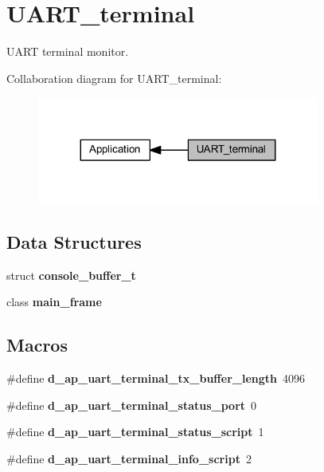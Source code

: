 \section{U\+A\+R\+T\+\_\+terminal}
\label{group___u_a_r_t__terminal}


U\+A\+RT terminal monitor.  


Collaboration diagram for U\+A\+R\+T\+\_\+terminal\+:
\nopagebreak
\begin{figure}[H]
\begin{center}
\leavevmode
\includegraphics[width=263pt]{group___u_a_r_t__terminal}
\end{center}
\end{figure}
\subsection*{Data Structures}
\begin{DoxyCompactItemize}
\item 
struct \textbf{ console\+\_\+buffer\+\_\+t}
\item 
class \textbf{ main\+\_\+frame}
\end{DoxyCompactItemize}
\subsection*{Macros}
\begin{DoxyCompactItemize}
\item 
\#define \textbf{ d\+\_\+ap\+\_\+uart\+\_\+terminal\+\_\+tx\+\_\+buffer\+\_\+length}~4096
\item 
\mbox{\label{group___u_a_r_t__terminal_ga8ef5406c651e45ccfc2cdc1c87490a8b}} 
\#define {\bfseries d\+\_\+ap\+\_\+uart\+\_\+terminal\+\_\+status\+\_\+port}~0
\item 
\mbox{\label{group___u_a_r_t__terminal_ga5d02361a165f63fdcdb611f9371e07ac}} 
\#define {\bfseries d\+\_\+ap\+\_\+uart\+\_\+terminal\+\_\+status\+\_\+script}~1
\item 
\mbox{\label{group___u_a_r_t__terminal_ga32886d66bfdbab0e9e6f73b63f06b7dd}} 
\#define {\bfseries d\+\_\+ap\+\_\+uart\+\_\+terminal\+\_\+info\+\_\+script}~2
\end{DoxyCompactItemize}
